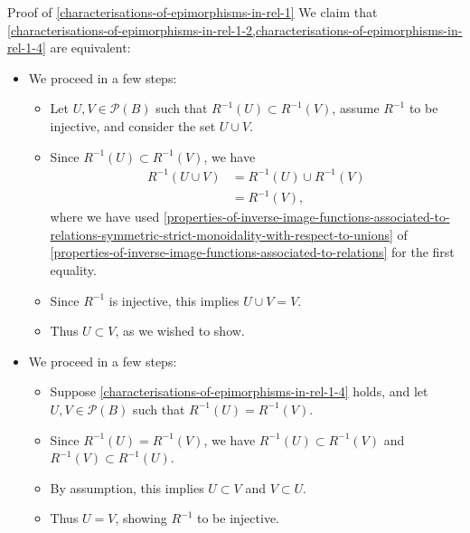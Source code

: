 \begin{Proof}{Proof of \cref{characterisations-of-epimorphisms-in-rel-1}}
    We claim that \cref{characterisations-of-epimorphisms-in-rel-1-2,characterisations-of-epimorphisms-in-rel-1-4} are equivalent:
    \begin{itemize}
        \item{}We proceed in a few steps:
            \begin{itemize}
                \item Let $U,V\in\mathcal{P}(B)$ such that $R^{-1}(U)\subset R^{-1}(V)$, assume $R^{-1}$ to be injective, and consider the set $U\cup V$.
                \item Since $R^{-1}(U)\subset R^{-1}(V)$, we have
                    \begin{align*}
                        R^{-1}(U\cup V) &= R^{-1}(U)\cup R^{-1}(V)\\
                                        &= R^{-1}(V),
                    \end{align*}
                    where we have used \cref{properties-of-inverse-image-functions-associated-to-relations-symmetric-strict-monoidality-with-respect-to-unions} of \cref{properties-of-inverse-image-functions-associated-to-relations} for the first equality.
                \item Since $R^{-1}$ is injective, this implies $U\cup V=V$.
                \item Thus $U\subset V$, as we wished to show.
            \end{itemize}
        \item{}We proceed in a few steps:
            \begin{itemize}
                \item Suppose \cref{characterisations-of-epimorphisms-in-rel-1-4} holds, and let $U,V\in\mathcal{P}(B)$ such that $R^{-1}(U)=R^{-1}(V)$.
                \item Since $R^{-1}(U)=R^{-1}(V)$, we have $R^{-1}(U)\subset R^{-1}(V)$ and $R^{-1}(V)\subset R^{-1}(U)$.
                \item By assumption, this implies $U\subset V$ and $V\subset U$.
                \item Thus $U=V$, showing $R^{-1}$ to be injective.
            \end{itemize}
    \end{itemize}


\end{Proof}
